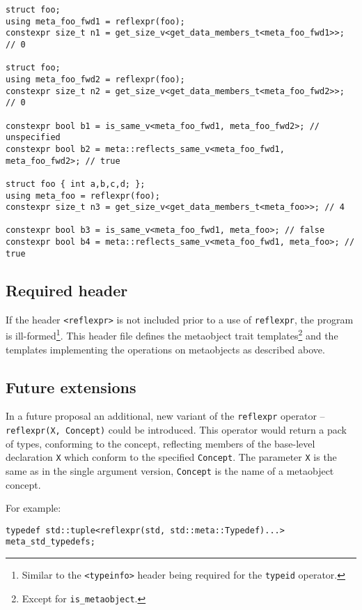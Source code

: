 \begin{verbatim}
struct foo;
using meta_foo_fwd1 = reflexpr(foo);
constexpr size_t n1 = get_size_v<get_data_members_t<meta_foo_fwd1>>; // 0

struct foo;
using meta_foo_fwd2 = reflexpr(foo);
constexpr size_t n2 = get_size_v<get_data_members_t<meta_foo_fwd2>>; // 0

constexpr bool b1 = is_same_v<meta_foo_fwd1, meta_foo_fwd2>; // unspecified
constexpr bool b2 = meta::reflects_same_v<meta_foo_fwd1, meta_foo_fwd2>; // true

struct foo { int a,b,c,d; };
using meta_foo = reflexpr(foo);
constexpr size_t n3 = get_size_v<get_data_members_t<meta_foo>>; // 4

constexpr bool b3 = is_same_v<meta_foo_fwd1, meta_foo>; // false
constexpr bool b4 = meta::reflects_same_v<meta_foo_fwd1, meta_foo>; // true
\end{verbatim}

\subsection{Required header}
\label{section-reflexpr-header}

If the header \texttt{<reflexpr>} is not included prior to a use
of \texttt{reflexpr}, the program is ill-formed\footnote{Similar to the
\texttt{<typeinfo>} header being required for the \texttt{typeid} operator.}.
This header file defines the metaobject trait templates\footnote{
Except for \texttt{is\_metaobject}.}
and the templates implementing the operations on metaobjects as described above.

\subsection{Future extensions}

In a future proposal an additional, new variant of the \texttt{reflexpr} operator
-- \texttt{reflexpr(X, Concept)} could be introduced.
This operator would return a pack of types, conforming to the  concept,
reflecting members of the base-level declaration \texttt{X} which conform to the specified
\texttt{Concept}. The parameter \texttt{X} is the same as in the single argument
version, \texttt{Concept} is the name of a metaobject concept.

For example:

\begin{verbatim}
typedef std::tuple<reflexpr(std, std::meta::Typedef)...> meta_std_typedefs;
\end{verbatim}

